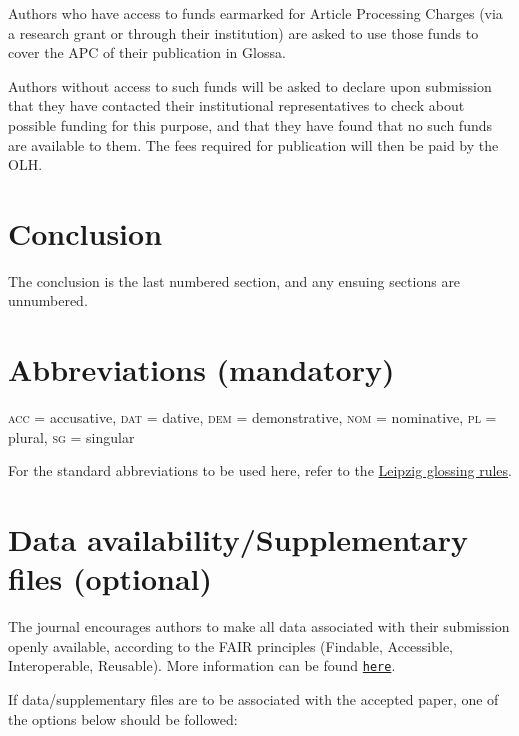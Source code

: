 \documentclass[]{glossa}
\begin{document}
Authors who have access to funds earmarked for Article Processing
Charges (via a research grant or through their institution) are asked to
use those funds to cover the APC of their publication in Glossa.

Authors without access to such funds will be asked to declare upon
submission that they have contacted their institutional representatives
to check about possible funding for this purpose, and that they have
found that no such funds are available to them. The fees required for
publication will then be paid by the OLH.

\hypertarget{conclusion}{%
\section{Conclusion}\label{conclusion}}

The conclusion is the last numbered section, and any ensuing sections
are unnumbered.

\hypertarget{abbrev}{%
\section*{Abbreviations (mandatory)}\label{abbrev}}

\textsc{acc} = accusative, \textsc{dat} = dative, \textsc{dem} =
demonstrative, \textsc{nom} = nominative, \textsc{pl} = plural,
\textsc{sg} = singular

For the standard abbreviations to be used here, refer to the
\href{https://www.eva.mpg.de/lingua/resources/glossing-rules.php}{Leipzig
glossing rules}.

\hypertarget{data-availabilitysupplementary-files-optional}{%
\section*{Data availability/Supplementary files
(optional)}\label{data-availabilitysupplementary-files-optional}}

The journal encourages authors to make all data associated with their
submission openly available, according to the FAIR principles (Findable,
Accessible, Interoperable, Reusable). More information can be found
\href{https://www.glossa-journal.org/about/editorialpolicies/\#data-policy}{\texttt{here}}.

If data/supplementary files are to be associated with the accepted
paper, one of the options below should be followed:
\end{document}
